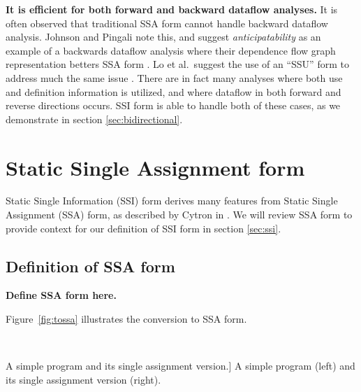 \documentclass[12pt,titlepage]{article}
\newcommand{\mysection}[1]{\section{#1}\setcounter{figure}{0}}
\begin{document}
\textbf{It is efficient for both forward and backward dataflow analyses.}
It is often observed that traditional SSA form cannot handle backward
dataflow analysis.  Johnson and Pingali note this, and suggest
\emph{anticipatability} as an example of a backwards dataflow analysis
where their dependence flow graph representation betters SSA form
\cite{johnson93:dfg}. Lo et al.\ suggest the use of an ``SSU'' form to
address much the same issue \cite{lo98:ssu}.  There are in fact many
analyses where both use and definition information is utilized, and
where dataflow in both forward and reverse directions occurs.  SSI
form is able to handle both of these cases, as we demonstrate in
section \ref{sec:bidirectional}.

\mysection{Static Single Assignment form}\label{sec:ssa}
Static Single Information (SSI) form derives many features from Static
Single Assignment (SSA) form, as described by Cytron in
\cite{cytron89:ssa}.  We will review SSA form to provide context for
our definition of SSI form in section \ref{sec:ssi}.

\subsection{Definition of SSA form}

\textbf{Define SSA form here.}

Figure~\vref{fig:tossa} illustrates the conversion to SSA form.
\begin{myfigure}
\begin{center}
 \vline\ 
\end{center}
\caption
[A simple program and its single assignment version.]
{A simple program (left) and its single assignment version (right).
\label{fig:tossa}}
\end{myfigure}
\end{document}
